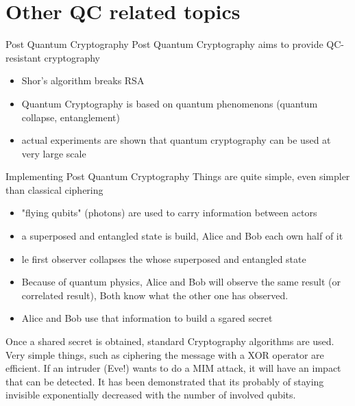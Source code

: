 \section{Other QC related topics}

\begin{frame}{Post Quantum Cryptography}
Post Quantum Cryptography aims to provide QC-resistant cryptography
\begin{itemize}
    \item Shor's algorithm breaks RSA
    \item Quantum Cryptography is based on quantum phenomenons (quantum collapse, entanglement)
    \item actual experiments are shown that quantum cryptography can be used at very large scale 
\end{itemize}
\end{frame}

\begin{frame}{Implementing Post Quantum Cryptography}
Things are quite simple, even simpler than classical ciphering
\begin{itemize}
    \item "flying qubits" (photons) are used to carry information between actors
    \item a superposed and entangled state is build, Alice and Bob each own half of it
    \item le first observer collapses the whose superposed and entangled state
    \item Because of quantum physics, Alice and Bob will observe the same result (or correlated result), Both know what
    the other one has observed. 
    \item Alice and Bob use that information to build a sgared secret
\end{itemize}
Once a shared secret is obtained, standard Cryptography algorithms are used. Very simple things, such as ciphering the 
message with a XOR operator are efficient. \newline \newline
If an intruder (Eve!) wants to do a MIM attack, it will have an impact that can be detected. It has been demonstrated
that its probably of staying invisible exponentially decreased with the number of involved qubits.
\end{frame}

